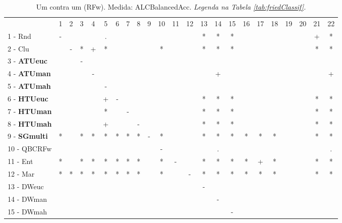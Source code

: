 \begin{table}[h]
\caption{Um contra um (RFw). Medida: ALCBalancedAcc. \textit{Legenda na Tabela \ref{tab:friedClassif}.}}
\begin{center}\begin{tabular}{lcc|cc|cc|cc|cc|cc|cc|cc|cc|cc|cc}
 			& 1 & 2 & 3 & 4 & 5 & 6 & 7 & 8 & 9 & 10 & 11 & 12 & 13 & 14 & 15 & 16 & 17 & 18 & 19 & 20 & 21 & 22\\
1 - Rnd  	& - &   &   &   & . &   &   &   &   &   &   &   & * & * & * &   &   &   &   &   & + & * \\
2 - Clu  	&   & - & * & + & * &   &   &   &   & * &   &   & * & * & * &   &   &   &   &   & * & * \\ \hline
3 - \textbf{ATUeuc}	&   &   & - &   &   &   &   &   &   &   &   &   &   &   &   &   &   &   &   &   &   &   \\
4 - \textbf{ATUman}	&   &   &   & - &   &   &   &   &   &   &   &   &   & + &   &   &   &   &   &   &   & + \\ \hline
5 - \textbf{ATUmah}	&   &   &   &   & - &   &   &   &   &   &   &   &   &   &   &   &   &   &   &   &   &   \\
6 - \textbf{HTUeuc}	&   &   &   &   & + & - &   &   &   &   &   &   & * & * & * &   &   &   &   &   & * & * \\ \hline
7 - \textbf{HTUman}	&   &   &   &   & * &   & - &   &   &   &   &   & * & * & * &   &   &   &   &   & * & * \\
8 - \textbf{HTUmah}	&   &   &   &   & + &   &   & - &   &   &   &   & * & * & * &   &   &   &   &   & * & * \\ \hline
9 - \textbf{SGmulti}	& * &   & * & * & * & * & * & * & - & * &   &   & * & * & * & * & * & * &   &   & * & * \\
10 - QBCRFw	&   &   &   &   &   &   &   &   &   & - &   &   &   & . &   &   &   &   &   &   &   & . \\ \hline
11 - Ent  	& * &   & * & * & * & * & * & * &   & * & - &   & * & * & * & * & + & * &   &   & * & * \\
12 - Mar  	& * & * & * & * & * & * & * & * &   & * &   & - & * & * & * & * & * & * &   &   & * & * \\ \hline
13 - DWeuc	&   &   &   &   &   &   &   &   &   &   &   &   & - &   &   &   &   &   &   &   &   &   \\
14 - DWman	&   &   &   &   &   &   &   &   &   &   &   &   &   & - &   &   &   &   &   &   &   &   \\ \hline
15 - DWmah	&   &   &   &   &   &   &   &   &   &   &   &   &   &   & - &   &   &   &   &   &   &   \\

\end{tabular}
\end{center}
\end{table}
